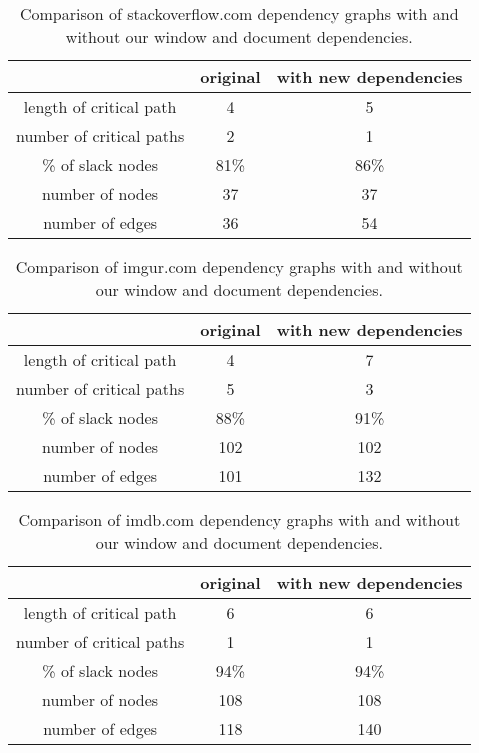 \begin{table*}[tb]
\centering
\small
\begin{tabular}{|c|c|c|}
\hline
 & original & with new dependencies \\
\hline
length of critical path & 4 & 5 \\
number of critical paths & 2 & 1 \\
\% of slack nodes & 81\% & 86\% \\
number of nodes & 37 & 37 \\
number of edges & 36 & 54 \\
\hline
\end{tabular}\caption{Comparison of stackoverflow.com dependency graphs with and without our window and document dependencies.}
\label{t:stackoverflowgraph}
\end{table*}

\begin{table*}[tb]
\centering
\small
\begin{tabular}{|c|c|c|}
\hline
 & original & with new dependencies \\
\hline
length of critical path & 4 & 7 \\
number of critical paths & 5 & 3 \\
\% of slack nodes & 88\% & 91\% \\
number of nodes & 102 & 102 \\
number of edges & 101 & 132 \\
\hline
\end{tabular}\caption{Comparison of imgur.com dependency graphs with and without our window and document dependencies.}
\label{t:imgurgraph}
\end{table*}

\begin{table*}[tb]
\centering
\small
\begin{tabular}{|c|c|c|}
\hline
 & original & with new dependencies \\
\hline
length of critical path & 6 & 6 \\
number of critical paths & 1 & 1 \\
\% of slack nodes & 94\% & 94\% \\
number of nodes & 108 & 108 \\
number of edges & 118 & 140 \\
\hline
\end{tabular}\caption{Comparison of imdb.com dependency graphs with and without our window and document dependencies.}
\label{t:imdbgraph}
\end{table*}


